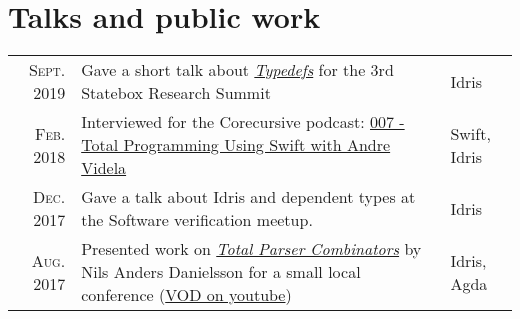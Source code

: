 \documentclass[a4paper,10pt]{article} %
\begin{document}

\section{Talks and public work}
\renewcommand{\arraystretch}{1.5}
\begin{tabular}{rp{10cm}|l}
\textsc{Sept.} 2019 & Gave a short talk about \href{https://www.youtube.com/watch?v=neWhiGeF2ZU}{\emph{Typedefs}} for the 3rd Statebox Research Summit & Idris \\
\textsc{Feb.} 2018 & Interviewed for the Corecursive podcast: \href{https://corecursive.com/007-total-programming-using-swift-with-andre-videla}{007 - Total Programming Using Swift with Andre Videla} & Swift, Idris\\
\textsc{Dec.} 2017 & Gave a talk about Idris and dependent types at the Software verification meetup. & Idris\\
\textsc{Aug.} 2017 & Presented work on \href{http://www.cse.chalmers.se/~nad/publications/danielsson-parser-combinators.html}{\emph{Total Parser Combinators}} by Nils Anders Danielsson for a small local conference (\href{https://www.youtube.com/watch?v=DzKVm6ApKFI}{VOD on youtube})& Idris, Agda\\

\end{tabular}
\renewcommand{\arraystretch}{1.2}


\end{document}
